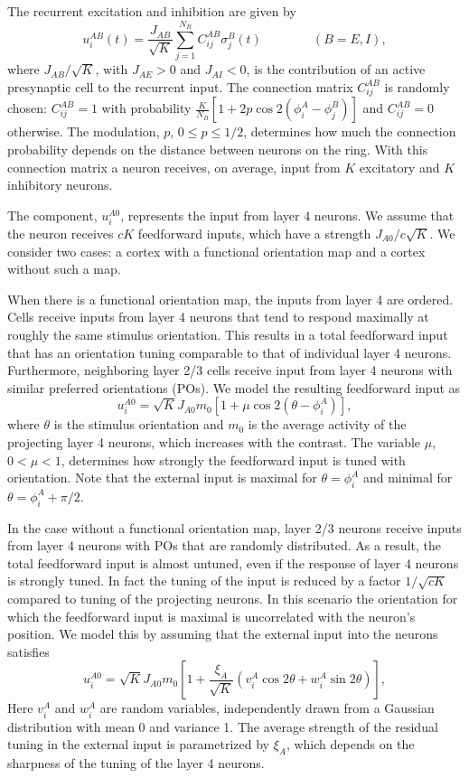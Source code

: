 The recurrent excitation and inhibition are given by
\begin{equation}
u_i^{AB}(t)=\frac{J_{AB}}{\sqrt{K}}\sum_{j=1}^{N_B}C_{ij}^{AB}\sigma_j^B(t)
\qquad \qquad (B=E,I),
\end{equation}
where $J_{AB}/\sqrt{K}$, with $J_{AE}>0$ and $J_{AI}<0$, is the contribution 
of an active presynaptic cell to the recurrent input.
The connection matrix $C_{ij}^{AB}$ is randomly chosen: $C_{ij}^{AB}=1$ 
with probability $\frac{K}{N_B}[1+2p\cos2(\phi_i^A-\phi_j^B)]$ and 
$C_{ij}^{AB}=0$ otherwise. The modulation, $p$, $0\leq p \leq 1/2$, determines 
how much the connection probability depends on the distance between neurons 
on the ring. With this connection matrix a neuron receives, on average, input 
from $K$ excitatory and $K$ inhibitory neurons. 

The component, $u_i^{A0}$, represents the input from layer 4 neurons.
We assume that the neuron receives $cK$ feedforward inputs, which have a 
strength $J_{A0}/c\sqrt{K}$\@. We consider two cases: a cortex
with a functional orientation map and a cortex without such a map.

When there is a functional orientation map, the inputs from layer 4 are 
ordered. Cells receive inputs from layer 4 neurons that tend to respond 
maximally at roughly the same stimulus orientation. This results in a total 
feedforward input that has an orientation tuning comparable to that of
individual layer 4 neurons. Furthermore, neighboring layer 2/3 cells receive 
input from layer 4 neurons with similar preferred orientations (POs). 
We model the resulting feedforward input as
\begin{equation}
u_i^{A0}=\sqrt{K}J_{A0}m_0\left[1+\mu\cos 2 (\theta-\phi_i^A)\right],
\end{equation}
where $\theta$ is the stimulus orientation and $m_0$ is the average activity of the
projecting layer 4 neurons, which increases with the contrast. 
The variable $\mu$, $0<\mu<1$, determines how strongly the feedforward input is 
tuned with orientation. 
Note that the external input is maximal for $\theta=\phi_i^A$ and minimal for
$\theta=\phi_i^A+\pi/2$\@.

In the case without a functional orientation map, layer 2/3 neurons receive 
inputs from layer 4 neurons with POs that are randomly 
distributed. As a result, the total feedforward input is almost untuned, 
even if the response of layer 4 neurons is strongly tuned. In fact the tuning 
of the input is reduced by a factor $1/\sqrt{cK}$ compared to tuning of the 
projecting neurons. In this scenario the orientation for which the 
feedforward input is maximal is uncorrelated with the neuron's position. 
We model this by assuming that the external input into the neurons
satisfies
\begin{equation}
u_i^{A0}=\sqrt{K}J_{A0}m_0\left[1+\frac{\xi_A}{\sqrt{K}}
(v_i^A\cos 2\theta+w_i^A\sin 2\theta)\right],
\end{equation} 
Here $v_i^A$ and $w_i^A$ are random variables, independently drawn from a 
Gaussian distribution with mean 0 and variance 1. The average strength of the 
residual tuning in the external input is parametrized by $\xi_A$,  which depends 
on the sharpness of the tuning of the layer 4 neurons.

